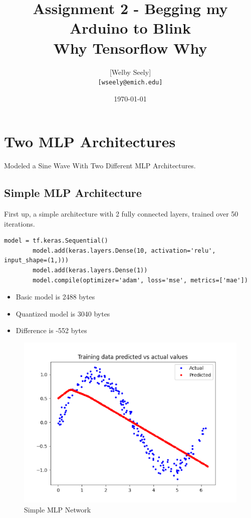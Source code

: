 \documentclass{article}
\title{Assignment 2 - Begging my Arduino to Blink \\
\large Why Tensorflow Why}
\author{
    [Welby Seely] \\
    \texttt{[wseely@emich.edu]}
}
\date{\today}
\begin{document}
    \maketitle


    \section{Two MLP Architectures}\label{sec:preamble}
    Modeled a Sine Wave With Two Different MLP Architectures.

    \subsection{Simple MLP Architecture}
    First up, a simple architecture with 2 fully connected layers, trained over 50 iterations.
    \\
    \begin{lstlisting}[label={lst:mlp1}]
        model = tf.keras.Sequential()
        model.add(keras.layers.Dense(10, activation='relu', input_shape=(1,)))
        model.add(keras.layers.Dense(1))
        model.compile(optimizer='adam', loss='mse', metrics=['mae'])
    \end{lstlisting}

    \begin{itemize}
        \item Basic model is 2488 bytes
        \item Quantized model is 3040 bytes
        \item Difference is -552 bytes
    \end{itemize}

    \begin{figure}[!htbp]
        \centerline{\includegraphics[width=0.8\columnwidth]{simple}}
        \caption{Simple MLP Network}
        \label{fig:simplemlp}
    \end{figure}
\end{document}
